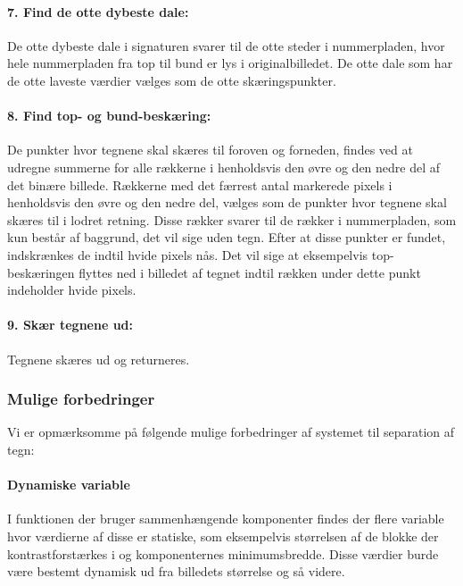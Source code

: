 \paragraph{7. Find de otte dybeste dale:}
De otte dybeste dale i signaturen svarer til de otte steder i nummerpladen, hvor hele nummerpladen fra top til bund er lys i originalbilledet. De otte dale som har de otte laveste værdier vælges som de otte skæringspunkter.

\paragraph{8. Find top- og bund-beskæring:} De punkter hvor tegnene skal skæres til foroven og forneden, findes ved at udregne summerne for alle rækkerne i henholdsvis den øvre og den nedre del af det binære billede. Rækkerne med det færrest antal markerede pixels i henholdsvis den øvre og den nedre del, vælges som de punkter hvor tegnene skal skæres til i lodret retning. Disse rækker svarer til de rækker i nummerpladen, som kun består af baggrund, det vil sige uden tegn. Efter at disse punkter er fundet, indskrænkes de indtil hvide pixels nås. Det vil sige at eksempelvis top-beskæringen flyttes ned i billedet af tegnet indtil rækken under dette punkt indeholder hvide pixels.

\paragraph{9. Skær tegnene ud:} Tegnene skæres ud og returneres.


\subsubsection{Mulige forbedringer}

Vi er opmærksomme på følgende mulige forbedringer af systemet til separation af tegn:

\paragraph{Dynamiske variable}
I funktionen der bruger sammenhængende komponenter findes der flere variable hvor værdierne af disse er statiske, som eksempelvis størrelsen af de blokke der kontrastforstærkes i og komponenternes minimumsbredde. Disse værdier burde være bestemt dynamisk ud fra billedets størrelse og så videre.

